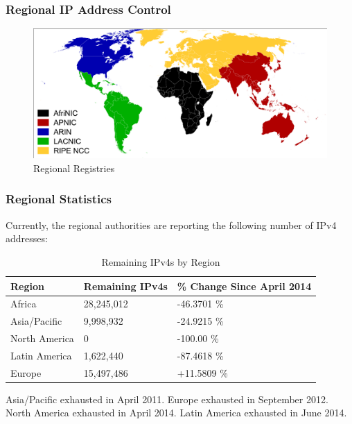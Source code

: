 \documentclass[aspectratio=169]{beamer}
\begin{document}
\begin{frame}
\frametitle{Regional IP Address Control}
\begin{figure}
\includegraphics[scale=0.44]{../artifacts/regional-registries.pdf}
\caption{Regional Registries}
\label{fig:regional}
\end{figure}
\end{frame}

\begin{frame}
\frametitle{Regional Statistics}
Currently, the regional authorities are reporting the following number of IPv4 addresses: \cite{he-stats}
\begin{table}
\begin{tabular}{|l|l|l|}
\hline
\textbf{Region} & \textbf{Remaining IPv4s} & \textbf{\% Change Since April 2014}\\
\hline
Africa & 28,245,012 & -46.3701 \%\\
\hline
Asia/Pacific & 9,998,932 & -24.9215 \%\\
\hline
North America & 0 & -100.00 \%\\
\hline
Latin America & 1,622,440 & -87.4618 \%\\
\hline
Europe & 15,497,486 & +11.5809 \%\\
\hline
\end{tabular}
\caption{Remaining IPv4s by Region}
\label{tbl:remaining}
\end{table}
Asia/Pacific exhausted in April 2011. Europe exhausted in September 2012. North America exhausted in April 2014. \cite{arin} Latin America exhausted in June 2014. \cite{lacnic}
\end{frame}
\end{document}
